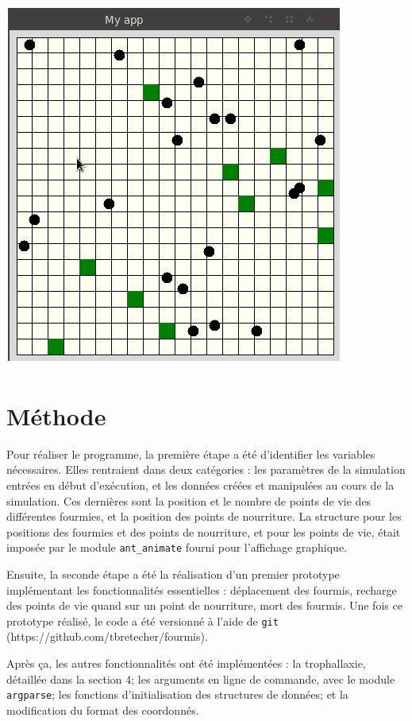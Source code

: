 \documentclass[a4paper,12pt]{article}
\begin{document}
\begin{center}
\includegraphics[scale=0.34]{fourmis.png}
\end{center}

\section{Méthode}

Pour réaliser le programme, la première étape a été d'identifier les variables nécessaires. Elles rentraient dans deux catégories : les paramètres de la simulation entrées en début d'exécution, et les données créées et manipulées au cours de la simulation. Ces dernières sont la position et le nombre de points de vie des différentes fourmies, et la position des points de nourriture.
La structure pour les positions des fourmies et des points de nourriture, et pour les points de vie, était imposée par le module \verb|ant_animate| fourni pour l'affichage graphique.

Ensuite, la seconde étape a été la réalisation d'un premier prototype implémentant les fonctionnalités essentielles : déplacement des fourmis, recharge des points de vie quand sur un point de nourriture, mort des fourmis. Une fois ce prototype réalisé, le code a été versionné à l'aide de \verb|git| (https://github.com/tbretecher/fourmis).

Après ça, les autres fonctionnalités ont été implémentées : la trophallaxie, détaillée dans la section 4; les arguments en ligne de commande, avec le module \verb|argparse|; les fonctions d'initialisation des structures de données; et la modification du format des coordonnés.
\end{document}
